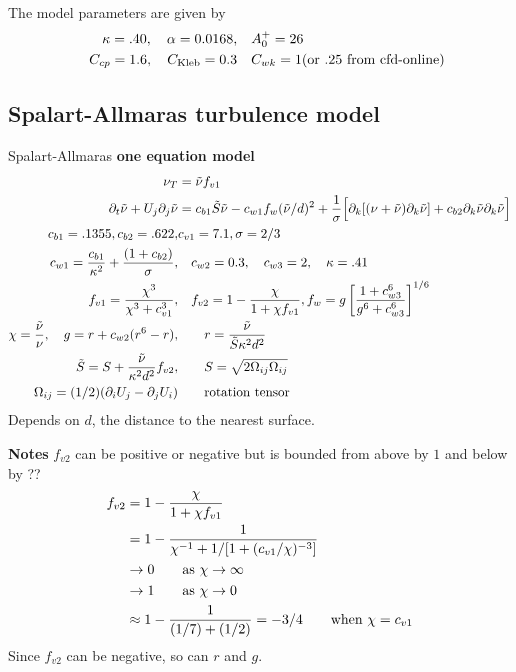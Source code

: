 The model parameters are given by
\begin{align*}
  \kappa=.40, \quad \alpha=0.0168, & \quad A_0^+ = 26 \\
  \quad C_{cp}=1.6, \quad  C_{\rm Kleb}=0.3  & \quad C_{wk} = 1 (\text{or $.25$ from cfd-online})
\end{align*}

\subsection{Spalart-Allmaras turbulence model}

Spalart-Allmaras {\bf one equation model}
\begin{align*}
  \nu_T &= \tilde{\nu} f_{v1} \\
\partial_t \tilde{\nu} + U_j \partial_j \tilde{\nu} &= c_{b1} \tilde{S} \tilde{\nu}
   - c_{w1} f_w (\tilde{\nu}/d)^2 + {1\over\sigma}\Big[  \partial_k[ (\nu+\tilde{\nu})\partial_k\tilde{\nu}]
   + c_{b2} \partial_k \tilde{\nu}\partial_k \tilde{\nu} \Big] \\
 c_{b1}=.1355, c_{b2}=.622, & c_{v1}=7.1, \sigma=2/3 \\
 c_{w1} = { c_{b1}\over\kappa^2} + {(1+c_{b2})\over\sigma},& \quad c_{w2}=0.3,\quad c_{w3}=2,\quad \kappa=.41\\
 f_{v1} = {\chi^3 \over \chi^3 + c_{v1}^3} ,& \quad f_{v2} = 1 - {\chi\over 1+\chi f_{v1}}, 
         f_w = g \left[ {1+ c_{w3}^6 \over g^6 +c_{w3}^6 }\right]^{1/6} \\
   \chi = {\tilde{\nu}\over \nu},\quad  g=r+c_{w2}(r^6-r), &\qquad r = {\tilde{\nu}\over \tilde{S}\kappa^2 d^2} \\
 \tilde{S} = S + {\tilde{\nu}\over \kappa^2 d^2} f_{v2}, &\qquad S= \sqrt{ 2 \Omega_{ij}\Omega_{ij}}  \\
\Omega_{ij} = (1/2) ( \partial_i U_j - \partial_j U_i ) & \qquad\mbox{rotation tensor}
\end{align*}
Depends on $d$, the distance to the nearest surface.

{\bf Notes}
$f_{v2}$ can be positive or negative but is bounded from above by $1$ and below by ??
\begin{align*}
   f_{v2} & = 1 - {\chi\over 1+\chi f_{v1}} \\
          & = 1 - { 1\over \chi^{-1} + 1/[1+ (c_{v1}/\chi)^{-3}] } \\
          & \rightarrow 0 \qquad\mbox{as $\chi\rightarrow \infty$} \\
          & \rightarrow 1 \qquad\mbox{as $\chi\rightarrow 0$} \\
          & \approx  1 - { 1\over (1/7) + (1/2) } = -3/4 \qquad\mbox{when $\chi=c_{v1}$}
\end{align*}
Since $f_{v2}$ can be negative, so can $r$ and $g$.


